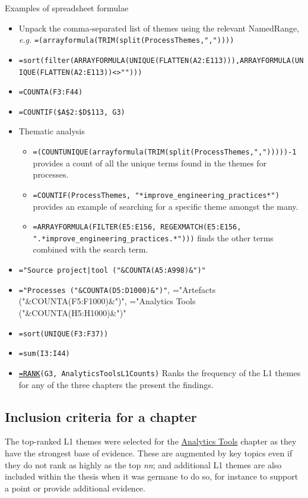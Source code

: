 Examples of spreadsheet formulae
{
\footnotesize
\begin{itemize}
    \item Unpack the comma-separated list of themes using the relevant NamedRange, \emph{e.g.} \texttt{=(arrayformula(TRIM(split(ProcessThemes,","))))}
    \item \texttt{=sort(filter(ARRAYFORMULA(UNIQUE(FLATTEN(A2:E113))),ARRAYFORMULA(UNIQUE(FLATTEN(A2:E113))<>"")))}
    \item \texttt{=COUNTA(F3:F44)}
    \item \texttt{=COUNTIF(\$A\$2:\$D\$113, G3)}
    \item Thematic analysis
    \begin{itemize}
        \item \texttt{=(COUNTUNIQUE(arrayformula(TRIM(split(ProcessThemes,",")))))-1} provides a count of all the unique terms found in the themes for processes.
        \item \texttt{=COUNTIF(ProcessThemes, "*improve\_engineering\_practices*")} provides an example of searching for a specific theme amongst the many.
        \item \texttt{=ARRAYFORMULA(FILTER(E5:E156, REGEXMATCH(E5:E156, ".*improve\_engineering\_practices.*")))} finds the other terms combined with the search term.
    \end{itemize}
    
    \item \texttt{="Source project|tool ("\&COUNTA(A5:A998)\&")"}
    
    \item \texttt{="Processes ("\&COUNTA(D5:D1000)\&")"}, ="Artefacts ("\&COUNTA(F5:F1000)\&")", ="Analytics Tools ("\&COUNTA(H5:H1000)\&")"
    \item \texttt{=sort(UNIQUE(F3:F37))}
    \item \texttt{=sum(I3:I44)}
    \item \texttt{\href{https://support.google.com/docs/answer/3094098?hl=en-GB}{=RANK}(G3, AnalyticsToolsL1Counts)} Ranks the frequency of the L1 themes for any of the three chapters the present the findings.
\end{itemize}
}

\subsection{Inclusion criteria for a chapter}
The top-ranked L1 themes were selected for the \href{chapter-tools-and-their-artefacts}{Analytics Tools} chapter as they have the strongest base of evidence. These are augmented by key topics even if they do not rank as highly as the top \emph{nn}; and additional L1 themes are also included within the thesis when it was germane to do so, for instance to support a point or provide additional evidence. 
